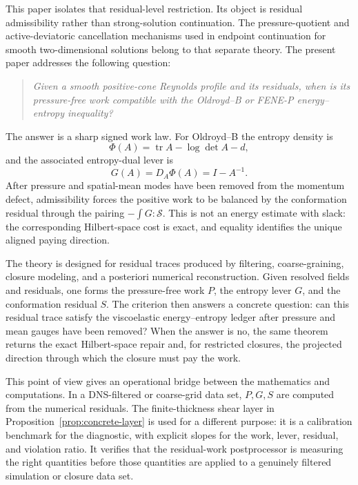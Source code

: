 \documentclass[11pt]{article}
\numberwithin{equation}{section}
\begin{document}
This paper isolates that residual-level restriction.  Its object is residual
admissibility rather than strong-solution continuation.  The pressure-quotient
and active-deviatoric cancellation mechanisms used in endpoint continuation
for smooth two-dimensional solutions \cite{PengEndpoint2026} belong to that
separate theory.  The present paper addresses the following question:

\begin{quote}
\emph{Given a smooth positive-cone Reynolds profile and its residuals, when is
its pressure-free work compatible with the Oldroyd--B or FENE-P
energy--entropy inequality?}
\end{quote}

The answer is a sharp signed work law.  For Oldroyd--B the entropy density is
\[
  \Phi(A)=\operatorname{tr}A-\log\det A-d,
\]
and the associated entropy-dual lever is
\[
  G(A)=D_A\Phi(A)=I-A^{-1}.
\]
After pressure and spatial-mean modes have been removed from the momentum
defect, admissibility forces the positive work to be balanced by the
conformation residual through the pairing \(-\int G:\mathcal S\).  This is not
an energy estimate with slack: the corresponding Hilbert-space cost is exact,
and equality identifies the unique aligned paying direction.

The theory is designed for residual traces produced by filtering,
coarse-graining, closure modeling, and a posteriori numerical reconstruction.
Given resolved fields and residuals, one forms the pressure-free work \(P\),
the entropy lever \(G\), and the conformation residual \(S\).  The criterion
then answers a concrete question: can this residual trace satisfy the
viscoelastic energy--entropy ledger after pressure and mean gauges have been
removed?  When the answer is no, the same theorem returns the exact
Hilbert-space repair and, for restricted closures, the projected direction
through which the closure must pay the work.

This point of view gives an operational bridge between the mathematics and
computations.  In a DNS-filtered or coarse-grid data set, \(P,G,S\) are computed
from the numerical residuals.  The finite-thickness shear layer in
Proposition~\ref{prop:concrete-layer} is used for a different purpose: it is a
calibration benchmark for the diagnostic, with explicit slopes for the work,
lever, residual, and violation ratio.  It verifies that the residual-work
postprocessor is measuring the right quantities before those quantities are
applied to a genuinely filtered simulation or closure data set.
\end{document}
